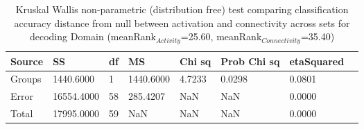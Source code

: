 \begin{table}
\centering
\begin{tabular}[0.2em]{@{}llllllll@{}}\toprule
Source & SS & df & MS & Chi sq & Prob Chi sq & etaSquared\\\toprule[0.2em]
Groups & 1440.6000 & 1 & 1440.6000 & 4.7233 & 0.0298 & 0.0801 \\\midrule
Error & 16554.4000 & 58 & 285.4207 & NaN & NaN & 0.0000 \\\midrule
Total & 17995.0000 & 59 & NaN & NaN & NaN & 0.0000 \\\bottomrule[0.2em]
\end{tabular}
\caption{Kruskal Wallis non-parametric (distribution free) test comparing classification accuracy distance from null between activation and connectivity across sets for decoding Domain (meanRank$_{Activity}$=25.60, meanRank$_{Connectivity}$=35.40)\label{tabel:null}}
\end{table}
